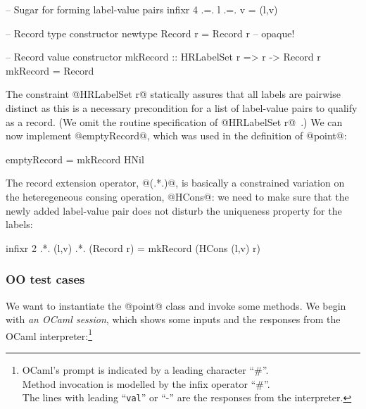 \documentclass{jfp}
\begin{document}
\begin{code}
 -- Sugar for forming label-value pairs
 infixr 4 .=.
 l .=. v = (l,v)
\end{code}

\begin{code}
 -- Record type constructor
 newtype Record r = Record r -- opaque!
\end{code}

\begin{code}
 -- Record value constructor
 mkRecord :: HRLabelSet r => r -> Record r
 mkRecord = Record
\end{code}

The constraint @HRLabelSet r@ statically assures that all labels are
pairwise distinct as this is a necessary precondition for a list of
label-value pairs to qualify as a record. (We omit the routine
specification of @HRLabelSet r@~\cite{HLIST-HW04}.) We can now
implement @emptyRecord@, which was used in the definition of @point@:

\begin{code}
 emptyRecord = mkRecord HNil
\end{code}

The record extension operator, @(.*.)@, is basically a constrained
variation on the heteregeneous consing operation, @HCons@: we need to
make sure that the newly added label-value pair does not disturb the
uniqueness property for the labels:

\begin{code}
 infixr 2 .*.
 (l,v) .*. (Record r) = mkRecord (HCons (l,v) r)
\end{code}






\subsubsection{OO test cases}

We want to instantiate the @point@ class and invoke some methods.  We
begin with \emph{an OCaml session}, which shows some inputs and the
responses from the OCaml interpreter:\footnote{OCaml's prompt is
indicated by a leading character ``\#''.\\ Method invocation is
modelled by the infix operator ``\#''.\\ The lines with leading
``\texttt{val}'' or ``-'' are the responses from the interpreter.}
\end{document}
